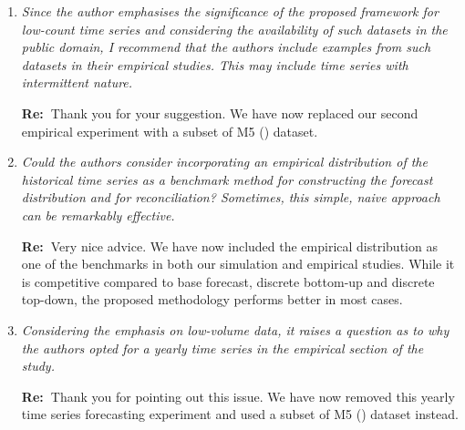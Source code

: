 \documentclass[11pt,a4paper]{article}
\newcommand{\RE}[2][Re:~]{{\color{blue}\textbf{#1}#2}}
\begin{document}
\begin{enumerate}
  \RE{Thank you for highlighting this issue. We agree with you that there is no study on quantifying the cost of rounding non-integer forecasts. We have now rephrased and clarified the possibility of rounding non-integer forecasts as follows:
  
  ``Regarding point forecasts, the reconciliation approaches yield non-integer forecasts because they project base forecasts from an incoherent real space onto a coherent real subspace (\citealp{panagiotelisForecastReconciliationGeometric2021}).
While rounding is a practical way to deal with non-integer forecasts, the rounded forecasts may not be coherent anymore.
In terms of distributional forecasts, it can even be more challenging to discretise the distributions while maintaining the probabilistic coherence.''}

  \item \textit{Since the author emphasises the significance of the proposed framework for low-count time series and considering the availability of such datasets in the public domain, I recommend that the authors include examples from such datasets in their empirical studies. This may include time series with intermittent nature.}
  
  \RE{Thank you for your suggestion. We have now replaced our second empirical experiment with a subset of M5 (\citealp{makridakisM5AccuracyCompetition2022}) dataset.}

  \item \textit{Could the authors consider incorporating an empirical distribution of the historical time series as a benchmark method for constructing the forecast distribution and for reconciliation? Sometimes, this simple, naive approach can be remarkably effective.}
  
  \RE{Very nice advice. We have now included the empirical distribution as one of the benchmarks in both our simulation and empirical studies. While it is competitive compared to base forecast, discrete bottom-up and discrete top-down, the proposed methodology performs better in most cases.}
  
  \item \textit{Considering the emphasis on low-volume data, it raises a question as to why the authors opted for a yearly time series in the empirical section of the study.}
 
  \RE{Thank you for pointing out this issue. We have now removed this yearly time series forecasting experiment and used a subset of M5 (\citealp{makridakisM5AccuracyCompetition2022}) dataset instead.}
  

\end{enumerate}
\end{document}
